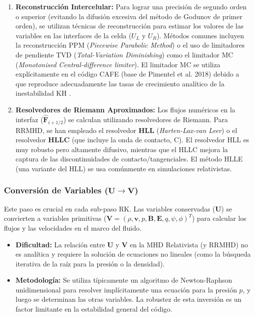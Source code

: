 \begin{enumerate}
    \item \textbf{Reconstrucción Intercelular:} Para lograr una precisión de segundo orden o superior (evitando la difusión excesiva del método de Godunov de primer orden), se utilizan técnicas de reconstrucción para estimar los valores de las variables en las interfaces de la celda ($U_L$ y $U_R$). Métodos comunes incluyen la reconstrucción PPM (\textit{Piecewise Parabolic Method}) o el uso de limitadores de pendiente TVD (\textit{Total-Variation Diminishing}) como el limitador MC (\textit{Monotonised Central-difference limiter}). El limitador MC se utiliza explícitamente en el código CAFE (base de Pimentel et al. 2018) debido a que reproduce adecuadamente las tasas de crecimiento analítico de la inestabilidad KH \cite{505}.
    \item \textbf{Resolvedores de Riemann Aproximados:} Los flujos numéricos en la interfaz ($\hat{\mathbf{F}}_{i+1/2}$) se calculan utilizando resolvedores de Riemann. Para RRMHD, se han empleado el resolvedor \textbf{HLL} (\textit{Harten-Lax-van Leer}) o el resolvedor \textbf{HLLC} (que incluye la onda de contacto, C). El resolvedor HLL es muy robusto pero altamente difusivo, mientras que el HLLC mejora la captura de las discontinuidades de contacto/tangenciales. El método HLLE (una variante del HLL) se usa comúnmente en simulaciones relativistas.
\end{enumerate}

\subsubsection{Conversión de Variables ($\mathbf{U} \to \mathbf{V}$)}
Este paso es crucial en cada sub-paso RK. Las variables conservadas ($\mathbf{U}$) se convierten a variables primitivas ($\mathbf{V} = (\rho, \mathbf{v}, p, \mathbf{B}, \mathbf{E}, q, \psi, \phi)^T$) para calcular los flujos y las velocidades en el marco del fluido.

\begin{itemize}
    \item \textbf{Dificultad:} La relación entre $\mathbf{U}$ y $\mathbf{V}$ en la MHD Relativista (y RRMHD) no es analítica y requiere la solución de ecuaciones no lineales (como la búsqueda iterativa de la raíz para la presión o la densidad).
    \item \textbf{Metodología:} Se utiliza típicamente un algoritmo de Newton-Raphson unidimensional para resolver implícitamente una ecuación para la presión $p$, y luego se determinan las otras variables. La robustez de esta inversión es un factor limitante en la estabilidad general del código.
\end{itemize}
